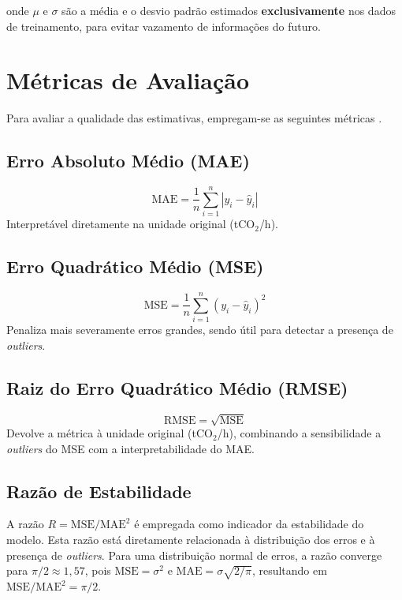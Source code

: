 onde \(\mu\) e \(\sigma\) são a média e o desvio padrão estimados \textbf{exclusivamente} nos dados de treinamento, para evitar vazamento de informações do futuro.

\section{Métricas de Avaliação}

Para avaliar a qualidade das estimativas, empregam-se as seguintes métricas \cite{chai2014root, willmott2005advantages, myttenaere2016mean}.

\subsection{Erro Absoluto Médio (\ac{MAE})}

\begin{equation}
\text{MAE} = \frac{1}{n} \sum_{i=1}^{n} |y_i - \hat{y}_i|
\label{eq:mae}
\end{equation}
Interpretável diretamente na unidade original (tCO\(_2\)/h).

\subsection{Erro Quadrático Médio (\ac{MSE})}

\begin{equation}
\text{MSE} = \frac{1}{n} \sum_{i=1}^{n} (y_i - \hat{y}_i)^2
\label{eq:mse}
\end{equation}
Penaliza mais severamente erros grandes, sendo útil para detectar a presença de \textit{outliers}.

\subsection{Raiz do Erro Quadrático Médio (\ac{RMSE})}

\begin{equation}
\text{RMSE} = \sqrt{\text{MSE}}
\label{eq:rmse}
\end{equation}
Devolve a métrica à unidade original (tCO\(_2\)/h), combinando a sensibilidade a \textit{outliers} do \ac{MSE} com a interpretabilidade do \ac{MAE}.

\subsection{Razão de Estabilidade}

A razão $R = \text{MSE} / \text{MAE}^2$ é empregada como indicador da estabilidade do modelo. Esta razão está diretamente relacionada à distribuição dos erros e à presença de \textit{outliers}. Para uma distribuição normal de erros, a razão converge para $\pi/2 \approx 1,57$, pois $\text{MSE} = \sigma^2$ e $\text{MAE} = \sigma \sqrt{2/\pi}$, resultando em $\text{MSE}/\text{MAE}^2 = \pi/2$.

